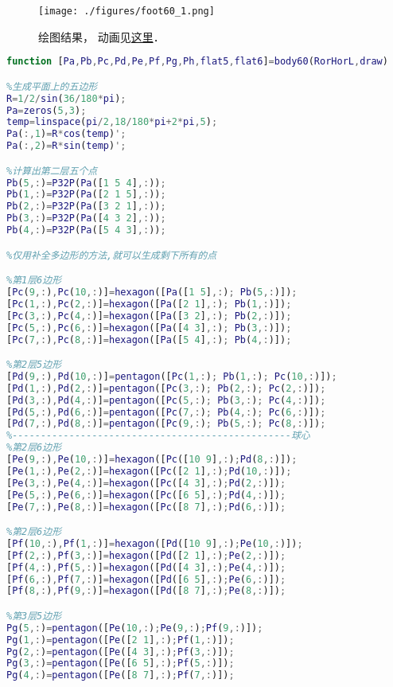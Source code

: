 
\begin{issues}
\issueDraft
\end{issues}


\begin{figure}[ht]
\centering
\texttt{[image: ./figures/foot60\_1.png]}
\caption{绘图结果， 动画见\href{https://wuli.wiki/apps/football.html}{这里}．} \label{foot60_fig1}
\end{figure}

\begin{lstlisting}[language=matlab, caption=body60.m]
function [Pa,Pb,Pc,Pd,Pe,Pf,Pg,Ph,flat5,flat6]=body60(RorHorL,draw)

%生成平面上的五边形
R=1/2/sin(36/180*pi);
Pa=zeros(5,3); 
temp=linspace(pi/2,18/180*pi+2*pi,5);
Pa(:,1)=R*cos(temp)';
Pa(:,2)=R*sin(temp)';

%计算出第二层五个点
Pb(5,:)=P32P(Pa([1 5 4],:));
Pb(1,:)=P32P(Pa([2 1 5],:));
Pb(2,:)=P32P(Pa([3 2 1],:));
Pb(3,:)=P32P(Pa([4 3 2],:));
Pb(4,:)=P32P(Pa([5 4 3],:));

%仅用补全多边形的方法,就可以生成剩下所有的点

%第1层6边形
[Pc(9,:),Pc(10,:)]=hexagon([Pa([1 5],:); Pb(5,:)]);
[Pc(1,:),Pc(2,:)]=hexagon([Pa([2 1],:); Pb(1,:)]);
[Pc(3,:),Pc(4,:)]=hexagon([Pa([3 2],:); Pb(2,:)]);
[Pc(5,:),Pc(6,:)]=hexagon([Pa([4 3],:); Pb(3,:)]);
[Pc(7,:),Pc(8,:)]=hexagon([Pa([5 4],:); Pb(4,:)]);

%第2层5边形
[Pd(9,:),Pd(10,:)]=pentagon([Pc(1,:); Pb(1,:); Pc(10,:)]);
[Pd(1,:),Pd(2,:)]=pentagon([Pc(3,:); Pb(2,:); Pc(2,:)]);
[Pd(3,:),Pd(4,:)]=pentagon([Pc(5,:); Pb(3,:); Pc(4,:)]);
[Pd(5,:),Pd(6,:)]=pentagon([Pc(7,:); Pb(4,:); Pc(6,:)]);
[Pd(7,:),Pd(8,:)]=pentagon([Pc(9,:); Pb(5,:); Pc(8,:)]);
%-------------------------------------------------球心
%第2层6边形
[Pe(9,:),Pe(10,:)]=hexagon([Pc([10 9],:);Pd(8,:)]);
[Pe(1,:),Pe(2,:)]=hexagon([Pc([2 1],:);Pd(10,:)]);
[Pe(3,:),Pe(4,:)]=hexagon([Pc([4 3],:);Pd(2,:)]);
[Pe(5,:),Pe(6,:)]=hexagon([Pc([6 5],:);Pd(4,:)]);
[Pe(7,:),Pe(8,:)]=hexagon([Pc([8 7],:);Pd(6,:)]);

%第2层6边形
[Pf(10,:),Pf(1,:)]=hexagon([Pd([10 9],:);Pe(10,:)]);
[Pf(2,:),Pf(3,:)]=hexagon([Pd([2 1],:);Pe(2,:)]);
[Pf(4,:),Pf(5,:)]=hexagon([Pd([4 3],:);Pe(4,:)]);
[Pf(6,:),Pf(7,:)]=hexagon([Pd([6 5],:);Pe(6,:)]);
[Pf(8,:),Pf(9,:)]=hexagon([Pd([8 7],:);Pe(8,:)]);

%第3层5边形
Pg(5,:)=pentagon([Pe(10,:);Pe(9,:);Pf(9,:)]);
Pg(1,:)=pentagon([Pe([2 1],:);Pf(1,:)]);
Pg(2,:)=pentagon([Pe([4 3],:);Pf(3,:)]);
Pg(3,:)=pentagon([Pe([6 5],:);Pf(5,:)]);
Pg(4,:)=pentagon([Pe([8 7],:);Pf(7,:)]);


\end{lstlisting}
